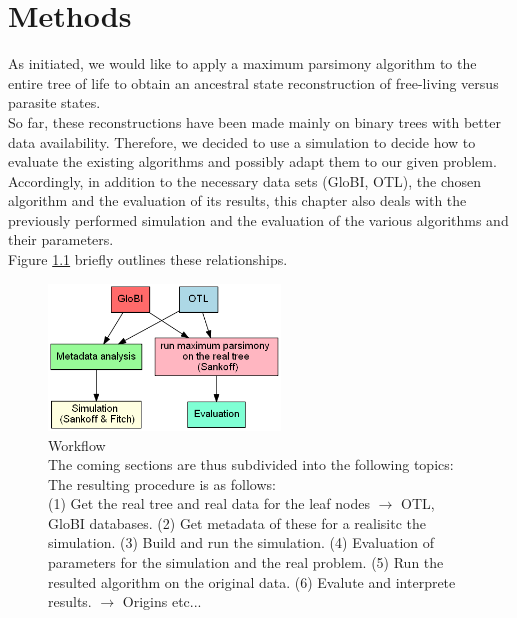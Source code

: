 \chapter{Methods}
  As initiated, we would like to apply a maximum parsimony algorithm to the entire tree of life to 
    obtain an ancestral state reconstruction of free-living versus parasite states. \\
  So far, these reconstructions have been made mainly on binary trees with better data availability. 
    Therefore, we decided to use a simulation to decide how to evaluate the existing algorithms and 
    possibly adapt them to our given problem. \\
  Accordingly, in addition to the necessary data sets (GloBI, OTL), the chosen algorithm and the 
    evaluation of its results, this chapter also deals with the previously performed simulation and 
    the evaluation of the various algorithms and their parameters. \\
  Figure \ref{fig:workflow} briefly outlines these relationships.
  \begin{figure}[h!]
    \centering
    \includegraphics[width=0.55\textwidth]{Figures/Workflow-overview.png}
    \caption{Workflow \\
      The coming sections are thus subdivided into the following topics: \\
       The resulting procedure is as follows: \\
      (1) Get the real tree and real data for the leaf nodes $\rightarrow$ OTL, GloBI databases.
      (2) Get metadata of these for a realisitc the simulation.
      (3) Build and run the simulation.
      (4) Evaluation of parameters for the simulation and the real problem.
      (5) Run the resulted algorithm on the original data.
      (6) Evalute and interprete results. $\rightarrow$ Origins etc...
    }
    \label{fig:workflow}
  \end{figure}

  
